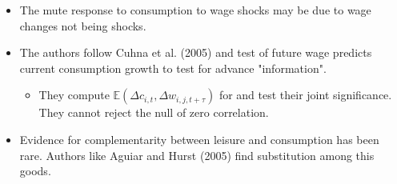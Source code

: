 \documentclass[notes=show]{beamer}
\begin{document}
\begin{frame}%



\begin{itemize}
\item The mute response to consumption to wage shocks may be due to wage
changes not being shocks.

\item The authors follow Cuhna et al. (2005) and test of future wage
predicts current consumption growth to test for advance "information".

\begin{itemize}
\item They compute $\mathbb{E}\left( \Delta c_{i,t},\Delta w_{i,j,t+\tau
}\right) $ for and test their joint significance. They cannot reject the
null of zero correlation.
\end{itemize}

\item Evidence for complementarity between leisure and consumption has been
rare. Authors like Aguiar and Hurst (2005) find substitution among this
goods.
\end{itemize}

\transboxout%
\end{frame}%

\bigskip
\end{document}
